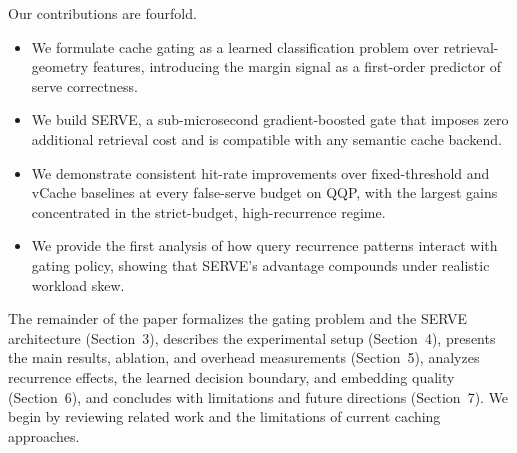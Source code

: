 Our contributions are fourfold.
\begin{itemize}
  \item We formulate cache gating as a learned classification problem over retrieval-geometry features, introducing the margin signal as a first-order predictor of serve correctness.
  \item We build SERVE, a sub-microsecond gradient-boosted gate that imposes zero additional retrieval cost and is compatible with any semantic cache backend.
  \item We demonstrate consistent hit-rate improvements over fixed-threshold and vCache baselines at every false-serve budget on QQP, with the largest gains concentrated in the strict-budget, high-recurrence regime.
  \item We provide the first analysis of how query recurrence patterns interact with gating policy, showing that SERVE's advantage compounds under realistic workload skew.
\end{itemize}

The remainder of the paper formalizes the gating problem and the SERVE architecture (Section~3), describes the experimental setup (Section~4), presents the main results, ablation, and overhead measurements (Section~5), analyzes recurrence effects, the learned decision boundary, and embedding quality (Section~6), and concludes with limitations and future directions (Section~7). We begin by reviewing related work and the limitations of current caching approaches.
